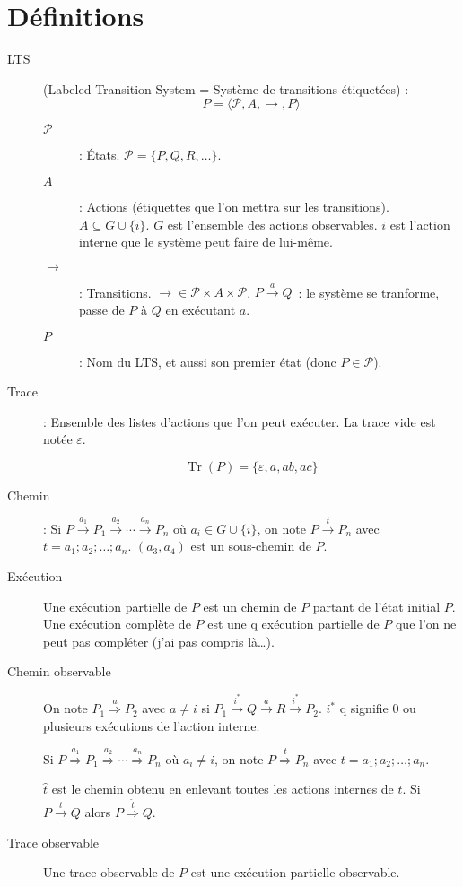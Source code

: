 \documentclass[a4paper,french,9pt]{article}
\def\P{\mathcal{P}}
\def\GUi{G \cup \{i\}}
\def\transition#1{\stackrel{#1}{\longrightarrow}}
\def\Transition#1{\stackrel{#1}{\Longrightarrow}}
\DeclareMathOperator{\Tr}{Tr}
\begin{document}
\section{Définitions}

\begin{description}
\item[LTS] (Labeled Transition System = Système de transitions étiquetées) : $$P = \langle\P,A,\rightarrow,P\rangle$$
  \begin{description}
  \item[$\P$]: États. $\P = \{P, Q, R, \dots\}$.
  \item[$A$]: Actions (étiquettes que l'on mettra sur les transitions). $A \subseteq \GUi$. $G$ est l'ensemble des actions observables. $i$
    est l'action interne que le système peut faire de lui-même.
  \item[$\rightarrow$]: Transitions. $\rightarrow \in \P\times A\times\P$. $P\transition{a}Q$~: le système se tranforme, passe de $P$ à $Q$
    en exécutant $a$.
  \item[$P$]: Nom du LTS, et aussi son premier état (donc $P \in \P$).
  \end{description}
\item[Trace]: Ensemble des listes d'actions que l'on peut exécuter. La trace vide est notée $\varepsilon$.
  \begin{center}
  \end{center}
  $$\Tr(P) = \{\varepsilon, a, ab, ac\}$$
\item[Chemin]: Si $P\transition{a_1}P_1\transition{a_2}\cdots\transition{a_n}P_n$ où $a_i \in \GUi$, on note $P\transition{t}P_n$ avec $t =
  a_1; a_2; \dots; a_n$. $(a_3,a_4)$ est un sous-chemin de $P$.
\item[Exécution] Une exécution partielle de $P$ est un chemin de $P$ partant de l'état initial $P$. Une exécution complète de $P$ est une q
  exécution partielle de $P$ que l'on ne peut pas compléter (j'ai pas compris là…).
\item[Chemin observable] On note $P_1\Transition{a}P_2$ avec $a \neq i$ si $P_1\transition{i^*}Q\transition{a}R\transition{i^*}P_2$. $i^*$ q
  signifie 0 ou plusieurs exécutions de l'action interne.
  
  Si $P\Transition{a_1}P_1\Transition{a_2}\cdots\Transition{a_n}P_n$ où $a_i \neq i$, on note $P\Transition{t}P_n$ avec $t = a_1; a_2;
  \dots; a_n$.
  
  $\hat{t}$ est le chemin obtenu en enlevant toutes les actions internes de $t$. Si $P\transition{t}Q$ alors $P\Transition{\hat{t}}Q$.
\item[Trace observable] Une trace observable de $P$ est une exécution partielle observable.
\end{description}
\end{document}
